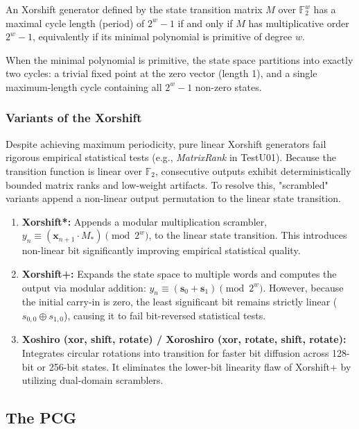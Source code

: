 \begin{theorem}
An Xorshift generator defined by the state transition matrix $M$ over $\mathbb{F}_2^w$ has a maximal cycle length (period) of $2^w - 1$ if and only if $M$ has multiplicative order $2^w - 1$, equivalently if its minimal polynomial is primitive of degree $w$.
\end{theorem}
When the minimal polynomial is primitive, the state space partitions into exactly two cycles: a trivial fixed point at the zero vector (length 1), and a single maximum-length cycle containing all $2^w - 1$ non-zero states.

\subsubsection{Variants of the Xorshift}

Despite achieving maximum periodicity, pure linear Xorshift generators fail rigorous empirical statistical tests (e.g., \textit{MatrixRank} in TestU01). Because the transition function is linear over $\mathbb{F}_2$, consecutive outputs exhibit deterministically bounded matrix ranks and low-weight artifacts. To resolve this, "scrambled" variants append a non-linear output permutation to the linear state transition.


\begin{enumerate}
    \item \textbf{Xorshift*:} Appends a modular multiplication scrambler, $y_n \equiv (\mathbf{x}_{n+1} \cdot M_{\ast}) \pmod{2^w}$, to the linear state transition. This introduces non-linear bit significantly improving empirical statistical quality.

    \item \textbf{Xorshift+:} Expands the state space to multiple words and computes the output via modular addition: $y_n \equiv (\mathbf{s}_0 + \mathbf{s}_1) \pmod{2^w}$. However, because the initial carry-in is zero, the least significant bit remains strictly linear ($s_{0,0} \oplus s_{1,0}$), causing it to fail bit-reversed statistical tests.

    \item \textbf{Xoshiro (xor, shift, rotate) / Xoroshiro (xor, rotate, shift, rotate):} Integrates circular rotations into transition for faster bit diffusion across 128-bit or 256-bit states. It eliminates the lower-bit linearity flaw of Xorshift+ by utilizing dual-domain scramblers.
\end{enumerate}


\subsection{The PCG}

